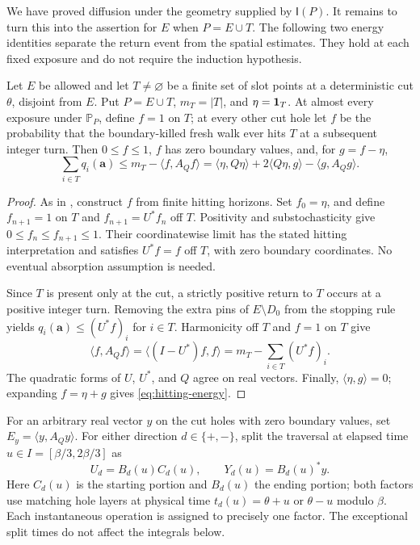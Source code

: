 We have proved diffusion under the geometry supplied by
\(\mathsf I(P)\).  It remains to turn this into the assertion
for \(E\) when \(P=E\cup T\).  The following two energy identities
separate the return event from the spatial estimates.  They hold at
each fixed exposure and do not require the induction hypothesis.

\begin{lemma}\label{lem:hitting-energy}
Let \(E\) be allowed and let \(T\ne\varnothing\) be a finite
set of slot points at a deterministic cut \(\theta\), disjoint
from \(E\).  Put \(P=E\cup T\), \(m_T=|T|\), and
\(\eta=\mathbf1_{T}\).  At almost every exposure under \(\mathbb P_P\),
define \(f=1\) on \(T\); at every other cut hole let \(f\) be
the probability that the boundary-killed fresh walk ever hits
\(T\) at a subsequent integer turn.  Then \(0\le f\le1\),
\(f\) has zero boundary values, and, for \(g=f-\eta\),
\begin{equation}\label{eq:hitting-energy}
 \sum_{i\in T}q_i(\mathbf a)
 \le m_T-\langle f,A_Qf\rangle
 =\langle\eta,Q\eta\rangle+2\langle Q\eta,g\rangle
       -\langle g,A_Qg\rangle.
\end{equation}
\end{lemma}

\begin{proof}
As in \cite[Lemma~4.5]{Ordering}, construct \(f\) from finite
hitting horizons.  Set \(f_0=\eta\), and define
\(f_{n+1}=1\) on \(T\) and \(f_{n+1}=U^*f_n\) off \(T\).
Positivity and substochasticity give
\(0\le f_n\le f_{n+1}\le1\).  Their coordinatewise limit
has the stated hitting interpretation and satisfies
\(U^*f=f\) off \(T\), with zero boundary coordinates.
No eventual absorption assumption is needed.

Since \(T\) is present only at the cut, a strictly positive
return to \(T\) occurs at a positive integer turn.  Removing the
extra pins of \(E\setminus D_0\) from the stopping rule yields
\(q_i(\mathbf a)\le(U^*f)_i\) for \(i\in T\).  Harmonicity
off \(T\) and \(f=1\) on \(T\) give
\[
 \langle f,A_Qf\rangle
 =\langle(I-U^*)f,f\rangle
 =m_T-\sum_{i\in T}(U^*f)_i.
\]
The quadratic forms of \(U\), \(U^*\), and \(Q\) agree on
real vectors.  Finally, \(\langle\eta,g\rangle=0\); expanding
\(f=\eta+g\) gives \eqref{eq:hitting-energy}.
\end{proof}

For an arbitrary real vector \(y\) on the cut holes with zero
boundary values, set \(E_y=\langle y,A_Qy\rangle\).  For either
direction \(d\in\{+,-\}\), split the traversal at elapsed time
\(u\in I=[\beta/3,2\beta/3]\) as
\[
 U_d=B_d(u)C_d(u),\qquad Y_d(u)=B_d(u)^*y.
\]
Here \(C_d(u)\) is the starting portion and \(B_d(u)\) the
ending portion; both factors use matching hole layers at physical
time \(t_d(u)=\theta+u\) or \(\theta-u\) modulo \(\beta\).
Each instantaneous operation is assigned to precisely one factor.
The exceptional split times do not affect the integrals below.

